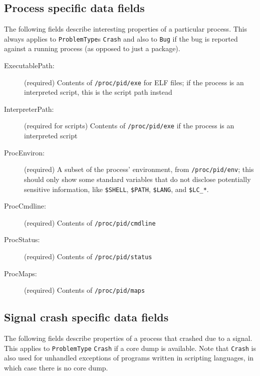\documentclass[DIV12,halfparskip]{scrartcl}
\begin{document}
\subsection{Process specific data fields}

The following fields describe interesting properties of a particular process.
This always applies to \verb!ProblemType!s \verb!Crash! and also to \verb!Bug!
if the bug is reported against a running process (as opposed to just a
package).

\begin{description}
    \item [ExecutablePath:] (required) Contents of \verb!/proc/pid/exe! for ELF
    files; if the process is an interpreted script, this is the script path instead

    \item [InterpreterPath:] (required for scripts) Contents of
    \verb!/proc/pid/exe! if the process is an interpreted script

    \item [ProcEnviron:] (required) A subset of the process' environment, from
    \verb!/proc/pid/env!; this should only show some standard variables that do
    not disclose potentially sensitive information, like \verb!$SHELL!,
    \verb!$PATH!, \verb!$LANG!, and \verb!$LC_*!.

    \item [ProcCmdline:] (required) Contents of \verb!/proc/pid/cmdline!

    \item [ProcStatus:] (required) Contents of \verb!/proc/pid/status!

    \item [ProcMaps:] (required) Contents of \verb!/proc/pid/maps!
\end{description}

\subsection{Signal crash specific data fields}

The following fields describe properties of a process that crashed due to a
signal. This applies to \verb!ProblemType! \verb!Crash! if a core dump is
available. Note that \verb!Crash! is also used for unhandled exceptions of
programs written in scripting languages, in which case there is no core dump.
\end{document}
